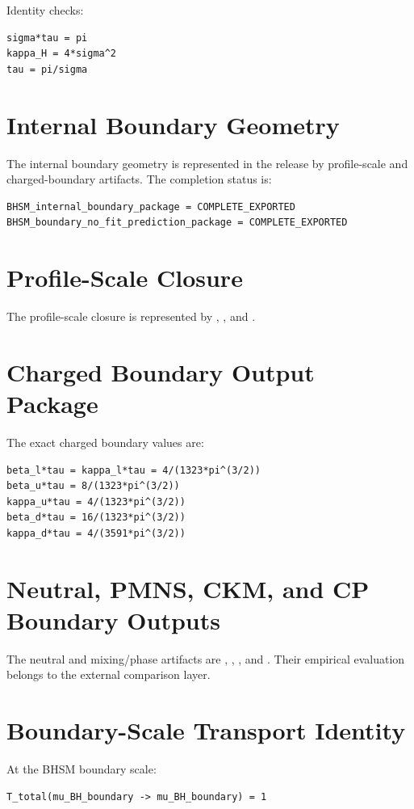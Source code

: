 \documentclass[11pt]{article}
\begin{document}
Identity checks:
\begin{verbatim}
sigma*tau = pi
kappa_H = 4*sigma^2
tau = pi/sigma
\end{verbatim}

\section{Internal Boundary Geometry}
The internal boundary geometry is represented in the release by profile-scale and charged-boundary artifacts. The completion status is:
\begin{verbatim}
BHSM_internal_boundary_package = COMPLETE_EXPORTED
BHSM_boundary_no_fit_prediction_package = COMPLETE_EXPORTED
\end{verbatim}

\section{Profile-Scale Closure}
The profile-scale closure is represented by , , and .

\section{Charged Boundary Output Package}
The exact charged boundary values are:
\begin{verbatim}
beta_l*tau = kappa_l*tau = 4/(1323*pi^(3/2))
beta_u*tau = 8/(1323*pi^(3/2))
kappa_u*tau = 4/(1323*pi^(3/2))
beta_d*tau = 16/(1323*pi^(3/2))
kappa_d*tau = 4/(3591*pi^(3/2))
\end{verbatim}

\section{Neutral, PMNS, CKM, and CP Boundary Outputs}
The neutral and mixing/phase artifacts are , , , and . Their empirical evaluation belongs to the external comparison layer.

\section{Boundary-Scale Transport Identity}
At the BHSM boundary scale:
\begin{verbatim}
T_total(mu_BH_boundary -> mu_BH_boundary) = 1
\end{verbatim}
\end{document}
